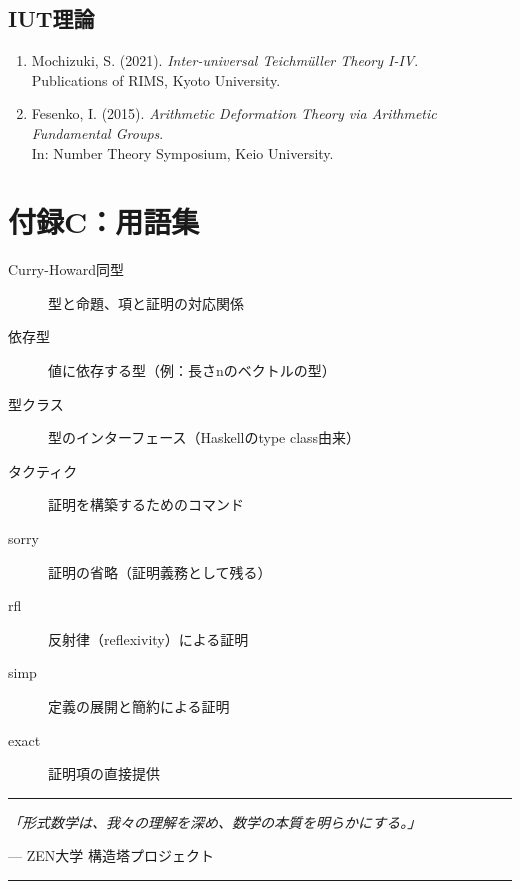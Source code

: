 \documentclass{ltjsarticle}
\begin{document}
\subsection{IUT理論}

\begin{enumerate}
\item Mochizuki, S. (2021). \textit{Inter-universal Teichmüller Theory I-IV}. \\
Publications of RIMS, Kyoto University.

\item Fesenko, I. (2015). \textit{Arithmetic Deformation Theory via Arithmetic Fundamental Groups}. \\
In: Number Theory Symposium, Keio University.
\end{enumerate}

\section{付録C：用語集}

\begin{description}
\item[Curry-Howard同型] 型と命題、項と証明の対応関係
\item[依存型] 値に依存する型（例：長さnのベクトルの型）
\item[型クラス] 型のインターフェース（Haskellのtype class由来）
\item[タクティク] 証明を構築するためのコマンド
\item[sorry] 証明の省略（証明義務として残る）
\item[rfl] 反射律（reflexivity）による証明
\item[simp] 定義の展開と簡約による証明
\item[exact] 証明項の直接提供
\end{description}

\vspace{2cm}

\begin{center}
\rule{0.8\textwidth}{0.4pt}

\textit{「形式数学は、我々の理解を深め、数学の本質を明らかにする。」}

--- ZEN大学 構造塔プロジェクト

\rule{0.8\textwidth}{0.4pt}
\end{center}
\end{document}
